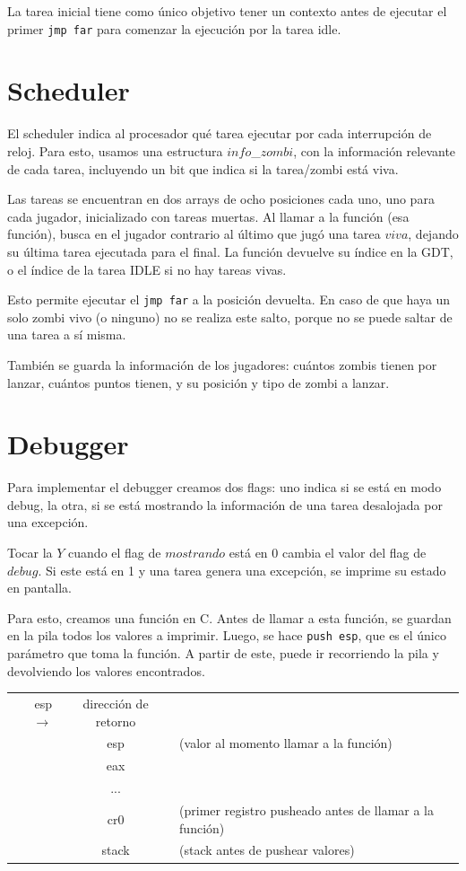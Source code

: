 \documentclass[a4paper]{article}
\begin{document}
La tarea inicial tiene como único objetivo tener un contexto antes de ejecutar el primer \texttt{jmp far} para comenzar la ejecución por la tarea idle.

\section{Scheduler}
El scheduler indica al procesador qué tarea ejecutar por cada interrupción de reloj. Para esto, usamos una estructura $info$_$zombi$, con la información relevante de cada tarea, incluyendo un bit que indica si la tarea/zombi está viva.

Las tareas se encuentran en dos arrays de ocho posiciones cada uno, uno para cada jugador, inicializado con tareas muertas. Al llamar a la función (esa función), busca en el jugador contrario al último que jugó una tarea $viva$, dejando su última tarea ejecutada para el final. La función devuelve su índice en la GDT, o el índice de la tarea IDLE si no hay tareas vivas.

Esto permite ejecutar el \texttt{jmp far} a la posición devuelta. En caso de que haya un solo zombi vivo (o ninguno) no se realiza este salto, porque no se puede saltar de una tarea a sí misma.

También se guarda la información de los jugadores: cuántos zombis tienen por lanzar, cuántos puntos tienen, y su posición y tipo de zombi a lanzar.

\section{Debugger} 
Para implementar el debugger creamos dos flags: uno indica si se está en modo debug, la otra, si se está mostrando la información de una tarea desalojada por una excepción.

Tocar la $Y$ cuando el flag de $mostrando$ está en 0 cambia el valor del flag de $debug$. Si este está en 1 y una tarea genera una excepción, se imprime su estado en pantalla.

Para esto, creamos una función en C. Antes de llamar a esta función, se guardan en la pila todos los valores a imprimir. Luego, se hace \texttt{push esp}, que es el único parámetro que toma la función. A partir de este, puede ir recorriendo la pila y devolviendo los valores encontrados.

\smallskip
\begin{tabular}{r|c|l}
esp $\rightarrow$ & dirección de retorno \\
\cline{2-2}
 & esp & (valor al momento llamar a la función)  \\
\cline{2-2}
 & eax &  \\
 \cline{2-2}
 & ...& \\
 \cline{2-2}
 & cr0 & (primer registro pusheado antes de llamar a la función) \\
 \cline{2-2}
 & stack & (stack antes de pushear valores)
 \end{tabular}
\smallskip 
\end{document}
